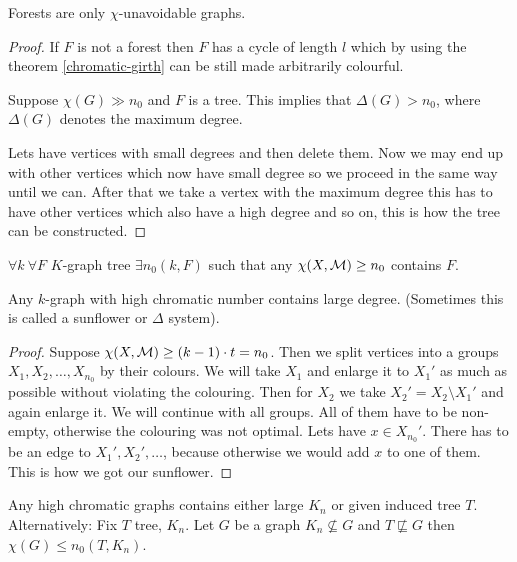\begin{cor}
	Forests are only $\chi$-unavoidable graphs.
\end{cor}

\begin{proof}
	If $F$ is not a forest then $F$ has a cycle of length $l$ which by using the theorem \ref{chromatic-girth} can be still made arbitrarily colourful.
	
	Suppose $\chi(G) \gg n_0$ and $F$ is a tree. This implies that $\Delta(G) > n_0$, where $\Delta(G)$ denotes the maximum degree.
	
	Lets have vertices with small degrees and then delete them. Now we may end up with other vertices which now have small degree so we proceed in the same way until we can. After that we take a vertex with the maximum degree this has to have other vertices which also have a high degree and so on, this is how the tree can be constructed.
\end{proof}

\begin{cor}
	$\forall k \ \forall F$ $K$-graph tree $\exists n_0(k,F)$ such that any $\chi(X, \mathcal{M}) \geq n_0$ contains $F$.
\end{cor}

\begin{lemma}
	Any $k$-graph with high chromatic number contains large degree. (Sometimes this is called a sunflower or $\Delta$ system).
\end{lemma}

\begin{proof}
	Suppose $\chi(X, \mathcal{M}) \geq (k-1) \cdot t = n_0$. Then we split vertices into a groups $X_1, X_2, \dots, X_{n_0}$ by their colours. We will take $X_1$ and enlarge it to $X_1'$ as much as possible without violating the colouring. Then for $X_2$ we take $X_2' = X_2 \setminus X_1'$ and again enlarge it. We will continue with all groups. All of them have to be non-empty, otherwise the colouring was not optimal. Lets have $x \in X_{n_0}'$. There has to be an edge to $X_1', X_2', \dots$, because otherwise we would add $x$ to one of them. This is how we got our sunflower.
\end{proof}

\begin{conj}
	Any high chromatic graphs contains either large $K_n$ or given induced tree $T$. Alternatively: Fix $T$ tree, $K_n$. Let $G$ be a graph $K_n \nsubseteq G$ and $T \not\sqsubseteq G$ then $\chi(G) \leq n_0(T, K_n)$.
\end{conj}

